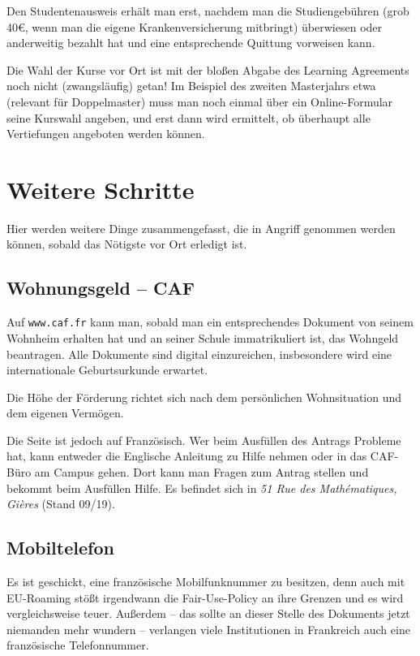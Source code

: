 \documentclass[11pt,a4paper]{article}
\begin{document}
	Den Studentenausweis erhält man erst, nachdem man die Studiengebühren (grob 40€, wenn man die eigene Krankenversicherung mitbringt) überwiesen oder anderweitig bezahlt hat und eine entsprechende Quittung vorweisen kann.
	
	Die Wahl der Kurse vor Ort ist mit der bloßen Abgabe des Learning Agreements noch nicht (zwangsläufig) getan! Im Beispiel des zweiten Masterjahrs etwa (relevant für Doppelmaster) muss man noch einmal über ein Online-Formular seine Kurswahl angeben, und erst dann wird ermittelt, ob überhaupt alle Vertiefungen angeboten werden können.
	
	\newpage
	\section{Weitere Schritte}
	
	Hier werden weitere Dinge zusammengefasst, die in Angriff genommen werden können, sobald das Nötigste vor Ort erledigt ist.
	
	\subsection{Wohnungsgeld -- CAF}
	
	Auf \texttt{www.caf.fr} kann man, sobald man ein entsprechendes Dokument von seinem Wohnheim erhalten hat und an seiner Schule immatrikuliert ist, das Wohngeld beantragen. Alle Dokumente sind digital einzureichen, insbesondere wird eine internationale Geburtsurkunde erwartet.
	
	Die Höhe der Förderung richtet sich nach dem persönlichen Wohnsituation und dem eigenen Vermögen.

  Die Seite ist jedoch auf Französisch. Wer beim Ausfüllen des Antrags Probleme hat, kann entweder die Englische Anleitung zu Hilfe nehmen oder in das CAF-Büro am Campus gehen. Dort kann man Fragen zum Antrag stellen und bekommt beim Ausfüllen Hilfe. Es befindet sich in \textit{51 Rue des Mathématiques, Gières} (Stand 09/19).
	
	\subsection{Mobiltelefon}
	
	Es ist geschickt, eine französische Mobilfunknummer zu besitzen, denn auch mit EU-Roaming stößt irgendwann die Fair-Use-Policy an ihre Grenzen und es wird vergleichsweise teuer. Außerdem -- das sollte an dieser Stelle des Dokuments jetzt niemanden mehr wundern -- verlangen viele Institutionen in Frankreich auch eine französische Telefonnummer. 
	
\end{document}
